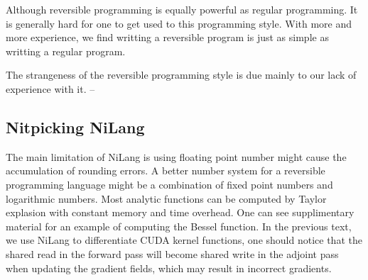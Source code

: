 Although reversible programming is equally powerful as regular programming. It is generally hard for one to get used to this programming style.
With more and more experience, we find writting a reversible program is just as simple as writting a regular program.
\begin{quoting}
The strangeness of the reversible programming style is due mainly to our lack of experience with it. -- ~\cite{Baker1992}
\end{quoting}

\subsection{Nitpicking NiLang}
The main limitation of NiLang is using floating point number might cause the accumulation of rounding errors.
A better number system for a reversible programming language might be a combination of fixed point numbers and logarithmic numbers.
Most analytic functions can be computed by Taylor explasion with constant memory and time overhead. One can see supplimentary material for an example of computing the Bessel function.
In the previous text, we use NiLang to differentiate CUDA kernel functions, one should notice that the shared read in the forward pass will become shared write in the adjoint pass when updating the gradient fields, which may result in incorrect gradients.


